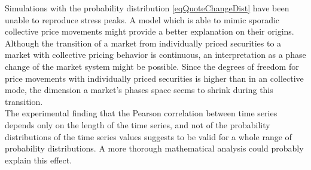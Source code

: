 \documentclass[11pt,twoside,a4paper]{article}
\numberwithin{equation}{section}
\numberwithin{figure}{section}
\numberwithin{table}{section}
\begin{document}
Simulations with the probability distribution \eqref{eqQuoteChangeDist} have been unable to reproduce stress peaks. A model which is able to mimic sporadic collective price movements might provide a better explanation on their origins.\\

Although the transition of a market from individually priced securities to a market with collective pricing behavior is continuous, an interpretation as a phase change of the market system might be possible. Since the degrees of freedom for price movements with individually priced securities is higher than in an collective mode, the dimension a market's phases space seems to shrink during this transition.\\

The experimental finding that the Pearson correlation between time series depends only on the length of the time series, and not of the probability distributions of the time series values suggests to be valid for a whole range of probability distributions. A more thorough mathematical analysis could probably explain this effect.
{}

\end{document}
